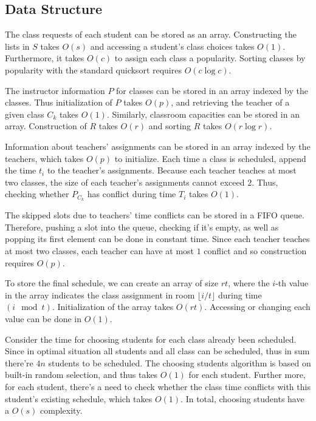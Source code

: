 \documentclass[11pt, oneside]{article}   	%
\begin{document}
\subsection{Data Structure}
The class requests of each student can be stored as an array. Constructing the lists in $S$ takes $O(s)$ and accessing a student's class choices takes $O(1)$. Furthermore, it takes $O(c)$ to assign each class a popularity. Sorting classes by popularity with the standard quicksort requires $O(c\log c)$.\par
The instructor information $P$ for classes can be stored in an array indexed by the classes. Thus initialization of $P$ takes $O(p)$, and retrieving the teacher of a given class $C_k$ takes $O(1)$. Similarly, classroom capacities can be stored in an array. Construction of $R$ takes $O(r)$ and sorting $R$ takes $O(r\log r)$.\par
Information about teachers' assignments can be stored in an array indexed by the teachers, which takes $O(p)$ to initialize. Each time a class is scheduled, append the time $t_i$ to the teacher's assignments. Because each teacher teaches at most two classes, the size of each teacher's assignments cannot exceed $2$. Thus, checking whether $P_{C_k}$ has conflict during time $T_i$ takes $O(1)$.\par
The skipped slots due to teachers' time conflicts can be stored in a FIFO queue. Therefore, pushing a slot into the queue, checking if it's empty, as well as popping its first element can be done in constant time. Since each teacher teaches at most two classes, each teacher can have at most $1$ conflict and so construction requires $O(p)$.\par
To store the final schedule, we can create an array of size $rt$, where the $i$-th value in the array indicates the class assignment in room $\lfloor i / t\rfloor$ during time $(i\mod t)$. Initialization of the array takes $O(rt)$. Accessing or changing each value can be done in $O(1)$.\par
Consider the time for choosing students for each class already been scheduled. Since in optimal situation all students and all class can be scheduled, thus in sum there're $4n$ students to be scheduled. The choosing students algorithm is based on built-in random selection, and thus takes $O(1)$ for each student. Further more, for each student, there's a need to check whether the class time conflicts with this student's existing schedule, which takes $O(1)$. In total, choosing students have a $O(s)$ complexity.
\end{document}

